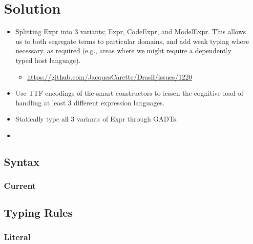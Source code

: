 \section{Solution}

\begin{itemize}
    
    \item Splitting Expr into 3 variants; Expr, CodeExpr, and ModelExpr.
          This allows us to both segregate terms to particular domains, and add
          weak typing where necessary, as required (e.g., areas where we might
          require a dependently typed host language).
          \begin{itemize}
            \item \url{https://github.com/JacquesCarette/Drasil/issues/1220}
          \end{itemize}
    
    \item Use TTF encodings of the smart constructors to lessen the cognitive
          load of handling at least 3 different expression languages.

    \item Statically type all 3 variants of Expr through GADTs.

    \item {}

\end{itemize}

\subsection{Syntax}

\subsubsection{Current}



\subsection{Typing Rules}

\subsubsection{Literal}

